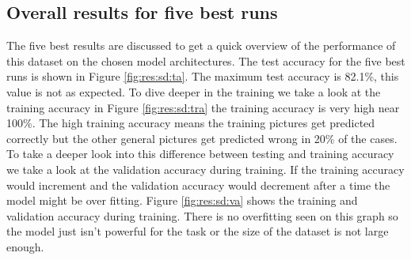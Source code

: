 	\subsection{Overall results for five best runs}
		The five best results are discussed to get a quick overview of the performance of this dataset on the chosen model architectures. The test accuracy for the five best runs is shown in Figure \ref{fig:res:sd:ta}. The maximum test accuracy is 82.1\%, this value is not as expected. To dive deeper in the training we take a look at the training accuracy in Figure \ref{fig:res:sd:tra} the training accuracy is very high near 100\%. The high training accuracy means the training pictures get predicted correctly but the other general pictures get predicted wrong in 20\% of the cases. To take a deeper look into this difference between testing and training accuracy we take a look at the validation accuracy during training. If the training accuracy would increment and the validation accuracy would decrement after a time the model might be over fitting. Figure \ref{fig:res:sd:va} shows the training and validation accuracy during training. There is no overfitting seen on this graph so the model just isn't powerful for the task or the size of the dataset is not large enough.
